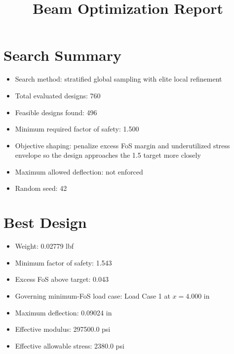 \documentclass[11pt]{article}
\title{Beam Optimization Report}
\date{}
\begin{document}
\maketitle

\section*{Search Summary}
\begin{itemize}
\item Search method: stratified global sampling with elite local refinement
\item Total evaluated designs: 760
\item Feasible designs found: 496
\item Minimum required factor of safety: 1.500
\item Objective shaping: penalize excess FoS margin and underutilized stress envelope so the design approaches the 1.5 target more closely
\item Maximum allowed deflection: not enforced
\item Random seed: 42
\end{itemize}

\section*{Best Design}
\begin{itemize}
\item Weight: 0.02779 lbf
\item Minimum factor of safety: 1.543
\item Excess FoS above target: 0.043
\item Governing minimum-FoS load case: Load Case 1 at $x=4.000$ in
\item Maximum deflection: 0.09024 in
\item Effective modulus: 297500.0 psi
\item Effective allowable stress: 2380.0 psi
\end{itemize}
\end{document}
